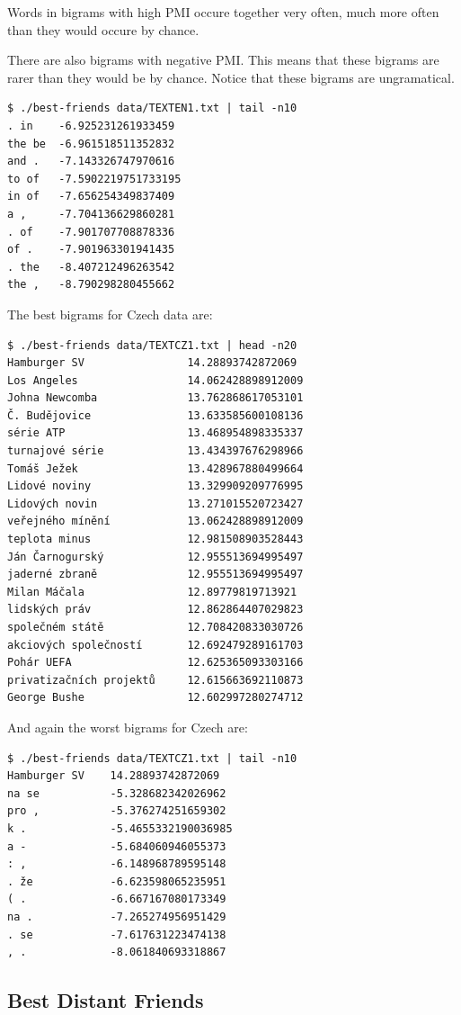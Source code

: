 \documentclass[12pt,a4paper]{article}
\begin{document}
Words in bigrams with high PMI occure together very often, much more often than they would occure by chance. 

There are also bigrams with negative PMI. This means that these bigrams are
rarer than they would be by chance. Notice that these bigrams are ungramatical.

\begin{verbatim}
$ ./best-friends data/TEXTEN1.txt | tail -n10
. in  	-6.925231261933459
the be	-6.961518511352832
and . 	-7.143326747970616
to of 	-7.5902219751733195
in of 	-7.656254349837409
a ,   	-7.704136629860281
. of  	-7.901707708878336
of .  	-7.901963301941435
. the 	-8.407212496263542
the , 	-8.790298280455662
\end{verbatim}

\noindent
The best bigrams for Czech data are:
\begin{verbatim}
$ ./best-friends data/TEXTCZ1.txt | head -n20
Hamburger SV            	14.28893742872069
Los Angeles             	14.062428898912009
Johna Newcomba          	13.762868617053101
Č. Budějovice           	13.633585600108136
série ATP               	13.468954898335337
turnajové série         	13.434397676298966
Tomáš Ježek             	13.428967880499664
Lidové noviny           	13.329909209776995
Lidových novin          	13.271015520723427
veřejného mínění        	13.062428898912009
teplota minus           	12.981508903528443
Ján Čarnogurský         	12.955513694995497
jaderné zbraně          	12.955513694995497
Milan Máčala            	12.89779819713921
lidských práv           	12.862864407029823
společném státě         	12.708420833030726
akciových společností   	12.692479289161703
Pohár UEFA              	12.625365093303166
privatizačních projektů 	12.615663692110873
George Bushe            	12.602997280274712
\end{verbatim}

\noindent
And again the worst bigrams for Czech are:

\begin{verbatim}
$ ./best-friends data/TEXTCZ1.txt | tail -n10
Hamburger SV	14.28893742872069
na se       	-5.328682342026962
pro ,       	-5.376274251659302
k .         	-5.4655332190036985
a -         	-5.684060946055373
: ,         	-6.148968789595148
. že        	-6.623598065235951
( .         	-6.667167080173349
na .        	-7.265274956951429
. se        	-7.617631223474138
, .         	-8.061840693318867
\end{verbatim}

\subsection{Best Distant Friends}
\end{document}
